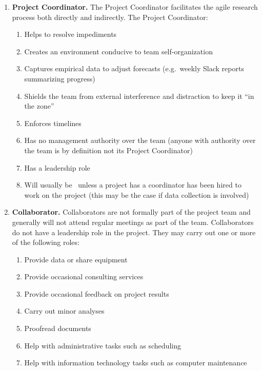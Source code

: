 \documentclass{tufte-book} %
\begin{document}
\begin{enumerate}
\item \textbf{Project Coordinator.} The Project Coordinator facilitates the agile research process both directly and indirectly. The Project Coordinator:
\begin{enumerate}
\item Helps to resolve impediments
\item Creates an environment conducive to team self-organization
\item Captures empirical data to adjust forecasts (e.g.\ weekly Slack reports summarizing progress)
\item Shields the team from external interference and distraction to keep it ``in the zone''
\item Enforces timelines
\item Has no management authority over the team (anyone with authority over the team is by definition not its Project Coordinator)
\item Has a leadership role
\item Will usually be \director~unless a project has a coordinator has been hired to work on the project (this may be the case if data collection is involved)
\end{enumerate}

\item \textbf{Collaborator.} Collaborators are not formally part of the project team and generally will not attend regular meetings as part of the team. Collaborators do not have a leadership role in the project. They may carry out one or more of the following roles:
\begin{enumerate}
\item Provide data or share equipment
\item Provide occasional consulting services
\item Provide occasional feedback on project results
\item Carry out minor analyses
\item Proofread documents
\item Help with administrative tasks such as scheduling
\item Help with information technology tasks such as computer maintenance


\end{enumerate}
\end{enumerate}
\end{document}
